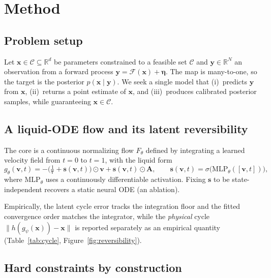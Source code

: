 \documentclass{article}
\begin{document}
\section{Method}
\label{sec:method}

\subsection{Problem setup}
Let $\mathbf{x}\in\mathcal{C}\subseteq\mathbb{R}^{d}$ be parameters constrained to a
feasible set $\mathcal{C}$ and $\mathbf{y}\in\mathbb{R}^{N}$ an observation from a
forward process $\mathbf{y}=\mathcal{F}(\mathbf{x})+\boldsymbol{\eta}$. The map is
many-to-one, so the target is the posterior $p(\mathbf{x}\mid\mathbf{y})$. We seek a
single model that (i)~predicts $\mathbf{y}$ from $\mathbf{x}$, (ii)~returns a point
estimate of $\mathbf{x}$, and (iii)~produces calibrated posterior samples, while
guaranteeing $\mathbf{x}\in\mathcal{C}$.

\subsection{A liquid-ODE flow and its latent reversibility}
The core is a continuous normalizing flow $F_\theta$ defined by integrating a learned
velocity field from $t{=}0$ to $t{=}1$, with the liquid form
\begin{equation}
g_\theta(\mathbf{v},t)= -\Big(\tfrac{1}{\boldsymbol{\tau}}+\mathbf{s}(\mathbf{v},t)\Big)\odot \mathbf{v}+\mathbf{s}(\mathbf{v},t)\odot \mathbf{A},\qquad \mathbf{s}(\mathbf{v},t)=\sigma\!\big(\mathrm{MLP}_\theta([\mathbf{v},t])\big),
\label{eq:liquid}
\end{equation}
where $\mathrm{MLP}_\theta$ uses a continuously differentiable activation. Fixing
$\mathbf{s}$ to be state-independent recovers a static neural ODE (an ablation).



Empirically, the latent cycle error tracks the integration floor and the fitted
convergence order matches the integrator, while the \emph{physical} cycle
$\lVert h(g_\psi(\mathbf{x}))-\mathbf{x}\rVert$ is reported separately as an
empirical quantity (Table~\ref{tab:cycle}, Figure~\ref{fig:reversibility}).

\subsection{Hard constraints by construction}

\end{document}

